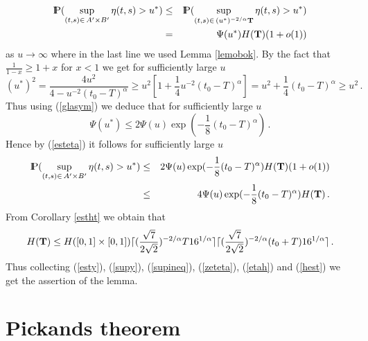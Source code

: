 \begin{eqnarray}
{\rm I\hspace{-0.8mm}P}(\sup_{(t,s)\in\,A'\times B'} \eta(t,s)>u^{*})&\leq&
{\rm I\hspace{-0.8mm}P}(\sup_{(t,s)\in\,(u^{*})^{-2/\alpha} {\bf T}} \eta(t,s)>u^{*})\nonumber\\
&=& \Psi(u^{*})H({\bf T})(1+o(1))\label{esteta}
\end{eqnarray}
as $u\rightarrow\infty$ where in the last line we used Lemma \ref{lemobok}.
By the fact that $\frac{1}{1-x}\geq 1+x$ for $x<1$ we get for sufficiently large $u$
$$
(u^{*})^2=\frac{4u^2}{4-u^{-2}(t_0-T)^\alpha}\geq
u^2[1+\frac{1}{4}u^{-2}(t_0-T)^\alpha]=u^2+\frac{1}{4}(t_0-T)^\alpha\geq u^2\,.
$$
Thus using (\ref{glasym}) we deduce that for sufficiently large $u$
$$
\Psi(u^*)\leq 2\Psi(u)\exp(-\frac{1}{8}(t_0-T)^\alpha)\,.
$$
Hence by (\ref{esteta}) it follows for sufficiently large $u$
\begin{eqnarray}
{\rm I\hspace{-0.8mm}P}(\sup_{(t,s)\in\,A'\times B'} \eta(t,s)>u^{*})&\leq&
2\Psi(u)\exp(-\frac{1}{8}(t_0-T)^\alpha)H({\bf T})(1+o(1))\nonumber\\
&\leq &4\Psi(u)\exp(-\frac{1}{8}(t_0-T)^\alpha)H({\bf T})\label{etah}\,.
\end{eqnarray}
From Corollary \ref{estht} we obtain that
\begin{equation}\label{hest}
H({\bf T})\leq
H([0,1]\times [0,1])\lceil (\frac{\sqrt{7}}{2\sqrt{2}})^{-2/\alpha}T 16^{1/\alpha} \rceil
\lceil (\frac{\sqrt{7}}{2\sqrt{2}})^{-2/\alpha}(t_0+T)16^{1/\alpha} \rceil\,.
\end{equation}
Thus collecting (\ref{esty}), (\ref{supy}), (\ref{supineq}), (\ref{zeteta}), (\ref{etah})
and (\ref{hest}) we get the assertion of the lemma.
\halmos







\section{Pickands theorem}

